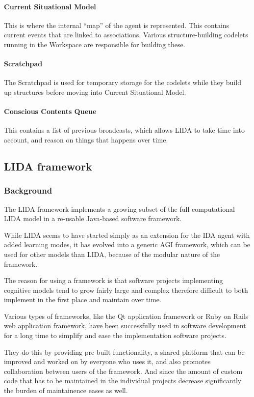 \paragraph{Current Situational Model} This is where the internal ``map'' of the agent is represented. This contains current events that are linked to associations. Various structure-building codelets running in the Workspace are responsible for building these.
\paragraph{Scratchpad} The Scratchpad is used for temporary storage for the codelets while they build up structures before moving into Current Situational Model.
\paragraph{Conscious Contents Queue} This contains a list of previous broadcasts, which allows LIDA to take time into account, and reason on things that happens over time.

\subsection{LIDA framework}
\subsubsection{Background}
The LIDA framework implements a growing subset of the full computational LIDA model in a re-usable Java-based software framework.

While LIDA seems to have started simply as an extension for the IDA agent with added learning modes,\cite{franklin2007lida} it has evolved into a generic AGI framework, which can be used for other models than LIDA, because of the modular nature of the framework.\cite{snaider2011lida}

The reason for using a framework is that software projects implementing cognitive models tend to grow fairly large and complex therefore difficult to both implement in the first place and maintain over time.

Various types of frameworks, like the Qt application framework or Ruby on Rails web application framework, have been successfully used in software development for a long time to simplify and ease the implementation software projects\cite{bachle2007rails}.

They do this by providing pre-built functionality, a shared platform that can be improved and worked on by everyone who uses it, and also promotes collaboration between users of the framework. And since the amount of custom code that has to be maintained in the individual projects decrease significantly the burden of maintainence eases as well.\cite{snaider2012lida}

